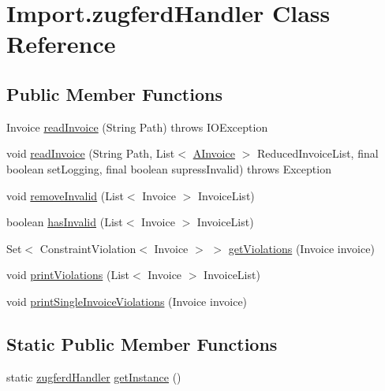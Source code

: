 \hypertarget{class_import_1_1zugferd_handler}{}\section{Import.\+zugferd\+Handler Class Reference}
\label{class_import_1_1zugferd_handler}
\subsection*{Public Member Functions}
\begin{DoxyCompactItemize}
\item 
Invoice \hyperlink{class_import_1_1zugferd_handler_aea79c23595f003c943e908c95276ecf9}{read\+Invoice} (String Path)  throws I\+O\+Exception
\item 
void \hyperlink{class_import_1_1zugferd_handler_a693fba6ff3bd23bb4783578b385e38a4}{read\+Invoice} (String Path, List$<$ \hyperlink{class_reduced_invoice_1_1_a_invoice}{A\+Invoice} $>$ Reduced\+Invoice\+List, final boolean set\+Logging, final boolean supress\+Invalid)  throws Exception 	
\item 
void \hyperlink{class_import_1_1zugferd_handler_aa5fbab8b4a7835f2b13167452f9d17db}{remove\+Invalid} (List$<$ Invoice $>$ Invoice\+List)
\item 
boolean \hyperlink{class_import_1_1zugferd_handler_a6999d186193b120650a5d24a49d10c6c}{has\+Invalid} (List$<$ Invoice $>$ Invoice\+List)
\item 
Set$<$ Constraint\+Violation$<$ Invoice $>$ $>$ \hyperlink{class_import_1_1zugferd_handler_acf26740b73f820812fadb01ccf712dd2}{get\+Violations} (Invoice invoice)
\item 
void \hyperlink{class_import_1_1zugferd_handler_ae8ae1fcc05ebddf4d2b53c8daeda7b00}{print\+Violations} (List$<$ Invoice $>$ Invoice\+List)
\item 
void \hyperlink{class_import_1_1zugferd_handler_aadb33b773805373add19d92eb713831b}{print\+Single\+Invoice\+Violations} (Invoice invoice)
\end{DoxyCompactItemize}
\subsection*{Static Public Member Functions}
\begin{DoxyCompactItemize}
\item 
static \hyperlink{class_import_1_1zugferd_handler}{zugferd\+Handler} \hyperlink{class_import_1_1zugferd_handler_ad3acd84340c8a5fcb2c01a2636979786}{get\+Instance} ()
\end{DoxyCompactItemize}


